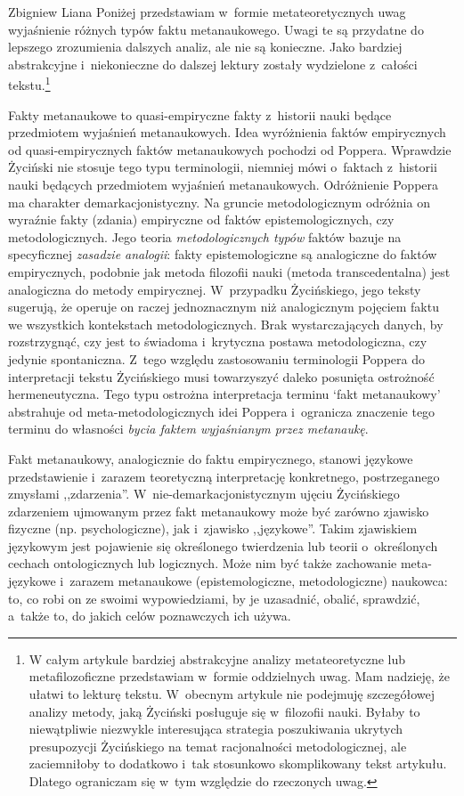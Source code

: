 \begin{artplenv}{Zbigniew Liana}
Poniżej przedstawiam w~formie metateoretycznych uwag wyjaśnienie różnych typów faktu metanaukowego. Uwagi te są
przydatne do lepszego zrozumienia dalszych analiz, ale nie są konieczne. Jako bardziej abstrakcyjne i~niekonieczne do
dalszej lektury zostały wydzielone z~całości tekstu.\footnote{W całym artykule bardziej abstrakcyjne analizy
metateoretyczne lub metafilozoficzne przedstawiam w~formie oddzielnych uwag. Mam nadzieję, że ułatwi to lekturę
tekstu. W~obecnym artykule nie podejmuję szczegółowej analizy metody, jaką Życiński posługuje się w~filozofii nauki. Byłaby to
niewątpliwie niezwykle interesująca strategia poszukiwania ukrytych presupozycji Życińskiego na temat racjonalności
metodologicznej, ale zaciemniłoby to dodatkowo i~tak stosunkowo skomplikowany tekst artykułu. Dlatego ograniczam się w~tym
względzie do rzeczonych uwag.}


\begin{uwaga}
Fakty metanaukowe to quasi-empiryczne fakty z~historii nauki będące przedmiotem wyjaśnień
metanaukowych. Idea wyróżnienia faktów empirycznych od quasi-empirycznych faktów metanaukowych pochodzi od Poppera.
Wprawdzie Życiński nie stosuje tego typu terminologii, niemniej mówi o~faktach z~historii nauki będących przedmiotem
wyjaśnień metanaukowych. Odróżnienie Poppera ma charakter demarkacjonistyczny. Na gruncie metodologicznym odróżnia on
wyraźnie fakty (zdania) empiryczne od faktów epistemologicznych, czy metodologicznych. Jego teoria
\textit{metodologicznych typów} faktów bazuje na specyficznej \textit{zasadzie analogii}: fakty epistemologiczne są
analogiczne do faktów empirycznych, podobnie jak metoda filozofii nauki (metoda transcedentalna) jest analogiczna do
metody empirycznej. W~przypadku Życińskiego, jego teksty sugerują, że operuje on raczej jednoznacznym niż analogicznym
pojęciem faktu we wszystkich kontekstach metodologicznych. Brak wystarczających danych, by rozstrzygnąć, czy jest to
świadoma i~krytyczna postawa metodologiczna, czy jedynie spontaniczna. Z~tego względu zastosowaniu terminologii Poppera
do interpretacji tekstu Życińskiego musi towarzyszyć daleko posunięta ostrożność hermeneutyczna. Tego typu ostrożna
interpretacja terminu `fakt metanaukowy' abstrahuje od meta-metodologicznych idei Poppera i~ogranicza znaczenie tego
terminu do własności \textit{bycia faktem wyjaśnianym przez metanaukę}.
\end{uwaga}

\begin{uwaga}
Fakt metanaukowy, analogicznie do faktu empirycznego, stanowi językowe przedstawienie i~zarazem
teoretyczną interpretację konkretnego, postrzeganego zmysłami ,,zdarzenia''. W~nie-demarkacjonistycznym ujęciu
Życińskiego zdarzeniem ujmowanym przez fakt metanaukowy może być zarówno zjawisko fizyczne (np. psychologiczne), jak i~zjawisko
,,językowe''. Takim zjawiskiem językowym jest pojawienie się określonego twierdzenia lub teorii o~określonych
cechach ontologicznych lub logicznych. Może nim być także zachowanie meta-językowe i~zarazem metanaukowe
(epistemologiczne, metodologiczne) naukowca: to, co robi on ze swoimi wypowiedziami, by je uzasadnić, obalić,
sprawdzić, a~także to, do jakich celów poznawczych ich używa.


\end{uwaga}
\end{artplenv}

